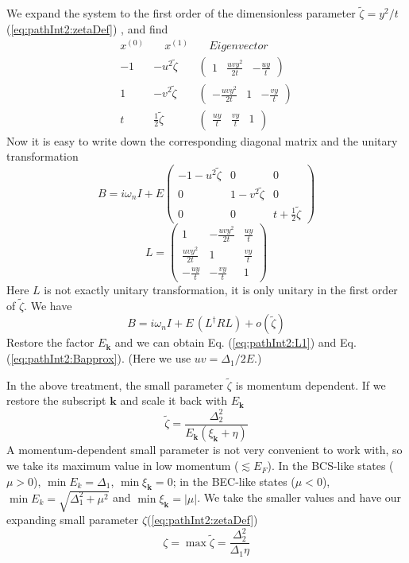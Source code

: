 \documentclass[reprint,pra]{revtex4-1}
\newcommand{\vk}{\ensuremath{\mathbf{k}}}
\newcommand{\nth}[1]{\ensuremath{\frac{1}{#1}}}
\providecommand{\abs}[1]{\ensuremath{\left\lvert{#1}\right\rvert}}
\newcommand{\mtrx}[1]{\ensuremath{\begin{pmatrix}#1\end{pmatrix}}}
\newcommand{\dg}{\ensuremath{\dagger}}
\begin{document}
We expand the system to the first order of the dimensionless parameter $\tilde\zeta=y^{2}/{t}$ (\ref{eq:pathInt2:zetaDef})%
, and find
\begin{equation}
\begin{array}{ccc}
x^{(0)}&\quad{}x^{(1)}&\quad{}Eigenvector\nonumber\\
-1&-u^{2}\tilde\zeta&\mtrx{1&\frac{uvy^{2}}{2t}&-\frac{uy}{t}}\\
1&-v^{2}\tilde\zeta&\mtrx{-\frac{uvy^{2}}{2t}&1&-\frac{vy}{t}}\\
t&\nth2\tilde\zeta&\mtrx{\frac{uy}{t}&\frac{vy}{t}&1}
\end{array}
\end{equation}
Now it is easy to write down the corresponding diagonal matrix and the unitary transformation
\begin{equation}
B=i\omega_{n}I+E\mtrx{-1-u^{2}\tilde\zeta&0&0\\0&1-v^{2}\tilde\zeta&0\\0&0&t+\nth2\tilde\zeta}
\end{equation}
\begin{equation}
L=\mtrx{1&-\frac{uvy^{2}}{2t}&\frac{uy}{t}\\\frac{uvy^{2}}{2t}&1&\frac{vy}{t}\\-\frac{uy}{t}&-\frac{vy}{t}&1}
\end{equation}
Here $L$ is not exactly unitary transformation, it is only unitary in the first order of  $\tilde\zeta$. We have 
\[
B=i\omega_{n}I+E\,(L^{\dg}RL)+o(\tilde\zeta)
\]
Restore the factor $E_{\vk}$ and we can obtain Eq. (\ref{eq:pathInt2:L1}) and Eq. (\ref{eq:pathInt2:Bapprox}).
(Here we use $uv=\Delta_{1}/2E$.)

In the above treatment, the small parameter $\tilde\zeta$ is momentum dependent.  If we restore the subscript $\vk$ and scale it  back with $E_{\vk}$
\begin{equation}
\tilde\zeta=\frac{\Delta_{2}^{2}}{E_{\vk}(\xi_{\vk}+\eta)}
\end{equation}
A momentum-dependent small parameter is not very convenient to work with, so we take its maximum value in low momentum ($\lesssim{}E_{F}$).  In the BCS-like states ($\mu>0$), $\min{E_{k}}=\Delta_{1}$, $\min{\xi_{\vk}}=0$; in the BEC-like states ($\mu<0$), $\min{E_{k}}=\sqrt{\Delta_{1}^{2}+\mu^{2}}$ and $\min{\xi_{\vk}}=\abs{\mu}$. We take the smaller values and have our expanding small parameter $\zeta$(\ref{eq:pathInt2:zetaDef})
\begin{equation}
\zeta=\max\tilde{\zeta}=\frac{\Delta_{2}^{2}}{\Delta_{1}\eta}
\end{equation}
\end{document}
